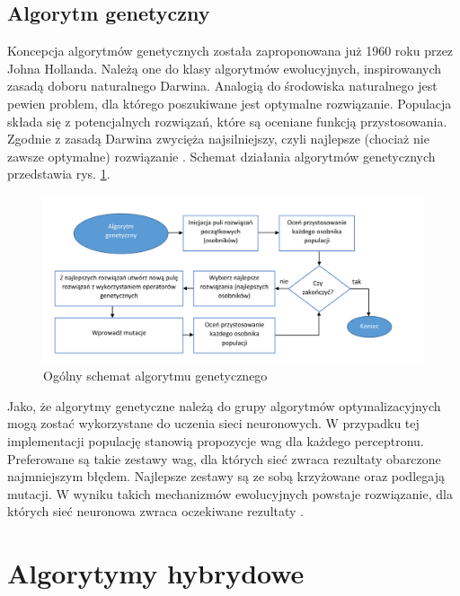 \documentclass[twoside]{iisthesis}
\begin{document}
 		 \subsection{Algorytm genetyczny}	
		 \label{ss:algorytm_genetyczny}
		 
		 Koncepcja algorytmów genetycznych została zaproponowana już 1960 roku przez Johna Hollanda. Należą one do klasy algorytmów ewolucyjnych, inspirowanych zasadą doboru naturalnego Darwina. Analogią do środowiska naturalnego jest pewien problem, dla którego poszukiwane jest optymalne rozwiązanie. Populacja składa się z potencjalnych rozwiązań, które są oceniane funkcją przystosowania. Zgodnie z zasadą Darwina zwycięża najsilniejszy, czyli najlepsze (chociaż nie zawsze optymalne) rozwiązanie \cite{pena2000evolutionary}. Schemat działania algorytmów genetycznych przedstawia rys. \ref{fig:algorytmgenetyczny}.	 
		 
		 
		 \begin{figure}[!ht] 
		 	\centering
		 	\includegraphics[width=1\textwidth]{algorytmgenetyczny}
		 	\caption{Ogólny schemat algorytmu genetycznego}
		 	\label{fig:algorytmgenetyczny}
		 \end{figure}

		 Jako, że algorytmy genetyczne należą do grupy algorytmów optymalizacyjnych mogą zostać wykorzystane do uczenia sieci neuronowych. W przypadku tej implementacji populację stanowią propozycje wag dla każdego perceptronu. Preferowane są takie zestawy wag, dla których sieć zwraca rezultaty obarczone najmniejszym błędem. Najlepsze zestawy są ze sobą krzyżowane oraz podlegają mutacji. W wyniku takich mechanizmów ewolucyjnych powstaje rozwiązanie, dla których sieć neuronowa zwraca oczekiwane rezultaty \cite{aforgenetgenetic,montana1989training}.
		 
		 
	 \section{Algorytymy hybrydowe}
		 
\end{document}

